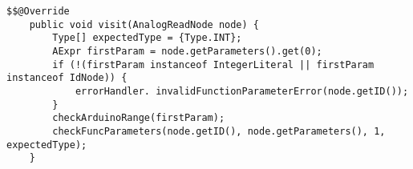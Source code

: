 \begin{lstlisting}[caption={Visit method for AnalogReadNode in FuncStructureVisitor}, label={AnalogReadNode}]
    $$@Override
    public void visit(AnalogReadNode node) {
        Type[] expectedType = {Type.INT};
        AExpr firstParam = node.getParameters().get(0);
        if (!(firstParam instanceof IntegerLiteral || firstParam instanceof IdNode)) {
            errorHandler. invalidFunctionParameterError(node.getID());
        }
        checkArduinoRange(firstParam);
        checkFuncParameters(node.getID(), node.getParameters(), 1, expectedType);
    }
\end{lstlisting}